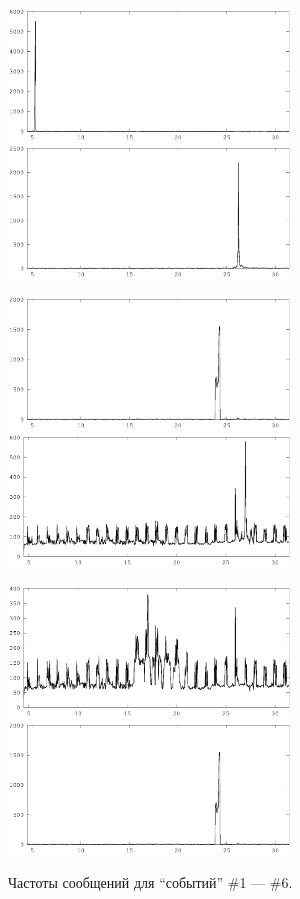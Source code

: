 \documentclass[12pt, a4paper]{article}
\begin{document}
	\begin{figure}[H]
	\centering

	\includegraphics[width=7.5cm]{all-freq-5-8.eps}	
	\includegraphics[width=7.5cm]{all-freq-26-5.eps}	
	
	\includegraphics[width=7.5cm]{all-freq-24-6.eps}	
	\includegraphics[width=7.5cm]{all-freq-27-0.eps}	
	
	\includegraphics[width=7.5cm]{all-freq-17-2.eps}	
	\includegraphics[width=7.5cm]{all-freq-23-20.eps}	
	
	\caption{Частоты сообщений для ``событий'' \#1 --- \#6.}
	\end{figure}
	
\end{document}
